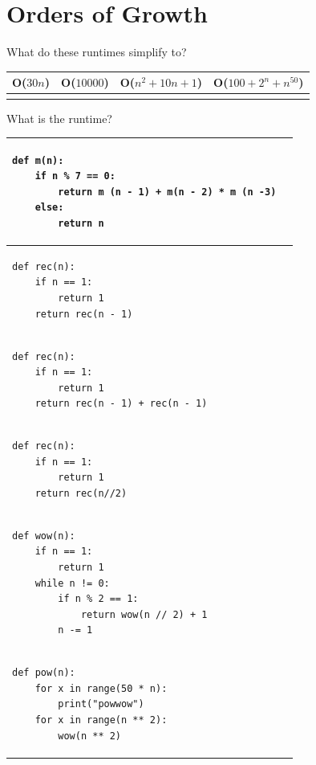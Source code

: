 \documentclass{exam}
\begin{document}
\section{Orders of Growth}
\begin{questions}
\item What do these runtimes simplify to? \newline
\begin{tabular}{ |p{2cm}|p{2cm}|p{4cm}|p{4cm}| } 
\hline 
O($30n$)& O($10000$) & O($n^2 + 10n + 1$) & O($100 + 2^n + n^50$) \\ \hline
 & & & \\
\hline 
\end{tabular}

\item What is the runtime?

\begin{center}
\begin{tabular}{ |p{13cm}|p{2cm}| } 
 \hline
 \begin{lstlisting}
def m(n):
    if n % 7 == 0:
        return m (n - 1) + m(n - 2) * m (n -3)
    else:
        return n
\end{lstlisting} &  \\  \hline
 \begin{lstlisting}
def rec(n):
    if n == 1:
        return 1
    return rec(n - 1)
\end{lstlisting} &  \\  \hline
 \begin{lstlisting}
def rec(n):
    if n == 1:
        return 1
    return rec(n - 1) + rec(n - 1)
\end{lstlisting} &  \\  \hline
 \begin{lstlisting}
def rec(n):
    if n == 1:
        return 1
    return rec(n//2)
\end{lstlisting} &  \\  \hline
 \begin{lstlisting}
def wow(n): 
    if n == 1:
        return 1
    while n != 0: 
        if n % 2 == 1: 
            return wow(n // 2) + 1
        n -= 1
\end{lstlisting} &  \\  \hline
 \begin{lstlisting}
def pow(n):
    for x in range(50 * n):
        print("powwow")
    for x in range(n ** 2):
        wow(n ** 2)
\end{lstlisting} &  \\  \hline
\end{tabular}
\end{center}


\end{questions}
\end{document}
